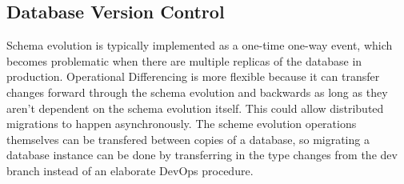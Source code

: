 \documentclass[english,submission]{programming}
\theoremstyle{definition}
\newtheorem*{remark}{Remark}
\begin{document}


\subsection{Database Version Control}\label{db-vc}

Schema evolution is typically implemented as a one-time one-way event, which becomes problematic when there are multiple replicas of the database in production. Operational Differencing is more flexible because it can transfer changes forward through the schema evolution and backwards as long as they aren't dependent on the schema evolution itself. This could allow distributed migrations to happen asynchronously.
The scheme evolution operations themselves can be transfered between copies of a database, so migrating a database instance can be done by transferring in the type changes from the dev branch instead of an elaborate DevOps procedure.
\end{document}
